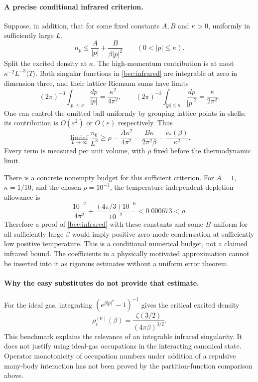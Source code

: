 \documentclass[11pt]{article}
\begin{document}
\paragraph{A precise conditional infrared criterion.}
Suppose, in addition, that for some fixed constants $A,B$ and
$\kappa>0$, uniformly in sufficiently large $L$,
\begin{equation}\label{bec:infrared}
 n_p\le\frac{A}{|p|}+\frac{B}{\beta|p|^2}
 \qquad(0<|p|\le\kappa).
\end{equation}
Split the excited density at $\kappa$. The high-momentum contribution
is at most $\kappa^{-2}L^{-3}\langle T\rangle$.
Both singular functions in \eqref{bec:infrared} are integrable at
zero in dimension three, and their lattice Riemann sums have limits
\[
 (2\pi)^{-3}\int_{|p|\le\kappa}\frac{dp}{|p|}
       =\frac{\kappa^2}{4\pi^2},\qquad
 (2\pi)^{-3}\int_{|p|\le\kappa}\frac{dp}{|p|^2}
       =\frac{\kappa}{2\pi^2}.
\]
One can control the omitted ball uniformly by grouping lattice points
in shells; its contribution is $O(\varepsilon^2)$ or
$O(\varepsilon)$ respectively. Thus
\begin{equation}\label{bec:depletion}
 \liminf_{L\to\infty}\frac{n_0}{L^3}
 \ge\rho-\frac{A\kappa^2}{4\pi^2}
          -\frac{B\kappa}{2\pi^2\beta}
          -\frac{e_*(\beta)}{\kappa^2}.
\end{equation}
Every term is measured per unit volume, with $\rho$ fixed before
the thermodynamic limit.

There is a concrete nonempty budget for this sufficient criterion.
For $A=1$, $\kappa=1/10$, and the chosen $\rho=10^{-3}$, the
temperature-independent depletion allowance is
\[
 \frac{10^{-2}}{4\pi^2}
 +\frac{(4\pi/3)10^{-6}}{10^{-2}}
 <0.000673<\rho.
\]
Therefore a proof of \eqref{bec:infrared} with these constants and
some $B$ uniform for all sufficiently large $\beta$ would imply
positive zero-mode condensation at sufficiently low positive temperature.
This is a conditional numerical budget, not a claimed infrared bound.
The coefficients in a physically motivated approximation cannot be
inserted into it as rigorous estimates without a uniform error theorem.

\paragraph{Why the easy substitutes do not provide that estimate.}
For the ideal gas, integrating
$(e^{\beta|p|^2}-1)^{-1}$ gives the critical excited density
\[
 \rho_c^{(0)}(\beta)=\frac{\zeta(3/2)}{(4\pi\beta)^{3/2}}.
\]
This benchmark explains the relevance of an integrable infrared
singularity. It does not justify using ideal-gas occupations in the
interacting canonical state. Operator monotonicity of occupation
numbers under addition of a repulsive many-body interaction has not
been proved by the partition-function comparison above.
\end{document}
